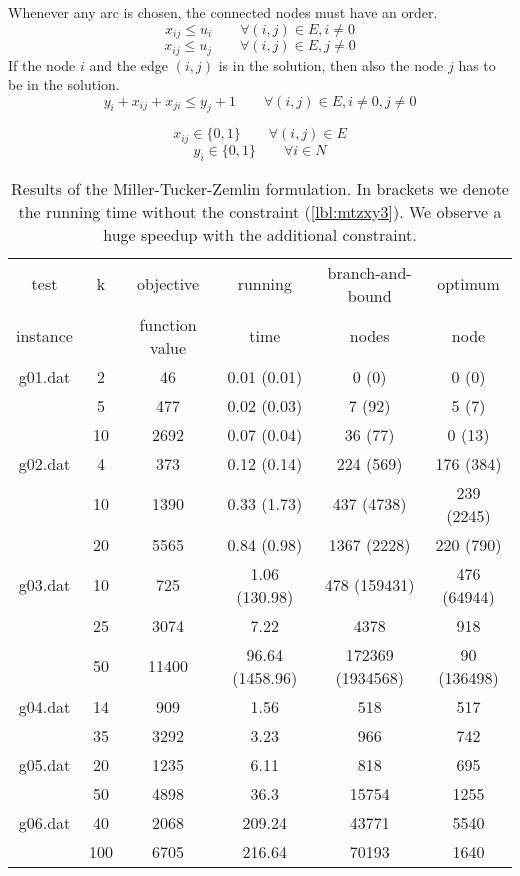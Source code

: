 \documentclass [11pt]{article}
\begin{document}
Whenever any arc is chosen, the connected nodes must have an order.
\begin{equation}
  x_{ij} \leq u_i \qquad \forall (i,j) \in E, i \neq 0
\end{equation}
\begin{equation}
  x_{ij} \leq u_j \qquad \forall (i,j) \in E, j \neq 0
\end{equation}
If the node $i$ and the edge $(i,j)$ is in the solution, then also the node $j$ has to be in the solution.
\begin{equation}
 y_{i} + x_{ij} + x_{ji} \leq y_{j} + 1 \qquad \forall (i,j) \in E, i \neq 0, j \neq 0
 \label{lbl:mtzxy3}
\end{equation}

\begin{equation}
x_{ij} \in \{0,1\} \qquad \forall (i,j) \in E
\end{equation}
\begin{equation}
  y_i \in \{0,1\} \qquad \forall i \in N
\end{equation}



\begin{table} \small
\centering
\begin{tabular}{cccccc}
\hline
test & k & objective & running  & branch-and-bound & optimum    \\
instance & & function value & time & nodes & node  \\
\hline
g01.dat 	& 2 & 46 & 0.01 (0.01) & 0 (0) & 0 (0) \\
		& 5 & 477 & 0.02 (0.03) & 7 (92) & 5 (7) \\
		& 10 & 2692 & 0.07 (0.04) & 36 (77) & 0 (13) \\
g02.dat 	& 4 & 373 & 0.12 (0.14) & 224 (569) & 176 (384) \\
		& 10 & 1390 & 0.33 (1.73) & 437 (4738) & 239 (2245) \\
		& 20 & 5565 & 0.84 (0.98) & 1367 (2228) & 220 (790) \\
g03.dat 	& 10 & 725 & 1.06 (130.98) & 478 (159431) & 476 (64944) \\
		& 25 & 3074 & 7.22 & 4378 & 918 \\
		& 50 & 11400 & 96.64 (1458.96) & 172369 (1934568) & 90 (136498) \\
g04.dat 	& 14 & 909 & 1.56 & 518 & 517 \\
		& 35 & 3292 & 3.23 & 966 & 742 \\
g05.dat 	& 20 & 1235 & 6.11 & 818 & 695 \\
		& 50 & 4898 & 36.3 & 15754 & 1255 \\
g06.dat 	& 40 & 2068 & 209.24 & 43771 & 5540 \\
		& 100 & 6705 & 216.64 & 70193 & 1640 \\
\hline
\end{tabular}
\caption{Results of the Miller-Tucker-Zemlin formulation.
In brackets we denote the running time without the constraint (\ref{lbl:mtzxy3}). %
We observe a huge speedup with the additional constraint.}
\label{tbl:mtz}
\end{table}

%
%
\end{document}
